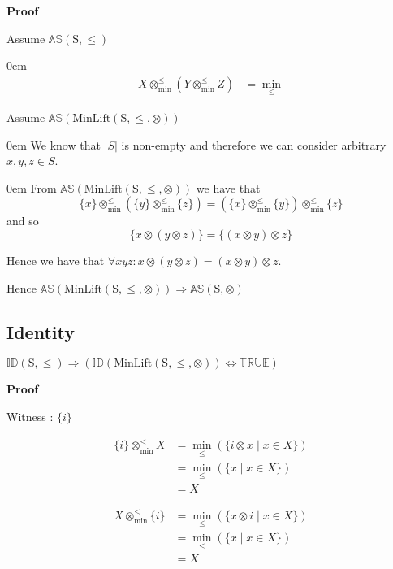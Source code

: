 \documentclass[10pt]{article}
\newcommand{\propname}[1]{{\mathbb{#1}}}
\newcommand{\minlift}{\otimes_{\min}^{\leq}}
\newcommand{\proof}{\vspace{1em} \textbf{Proof} \vspace{1em}}
\newenvironment{ind}[0]{\begin{addmargin}[1em]{0em}\vspace{0.5em}}{\end{addmargin}\vspace{0.5em}}
\begin{document}
\proof

Assume $\propname{AS}(\mathrm{S,\leq})$
\begin{ind}
\begin{align*}
X \minlift (Y \minlift Z) 	& = \min_\leq
\end{align*}
\end{ind}

\vspace{0.5em}


Assume $\propname{AS}(\mathrm{MinLift(S,\leq,\otimes)})$

\begin{ind}
We know that $|S|$ is non-empty and therefore we can consider arbitrary $x, y, z \in S$. 
\begin{ind}
From $\propname{AS}(\mathrm{MinLift(S,\leq,\otimes)})$ we have that
\begin{equation*}
\{ x \} \minlift (\{ y \} \minlift \{ z \}) = (\{ x \} \minlift \{ y \}) \minlift \{ z \}
\end{equation*}
and so
\begin{equation*}
\{x \otimes (y \otimes z) \} = \{ (x \otimes y) \otimes z \}
\end{equation*}
\end{ind}
Hence we have that $\forall x y z : x \otimes (y \otimes z) = (x \otimes y) \otimes z$.
\end{ind}
Hence $\propname{AS}(\mathrm{MinLift(S,\leq,\otimes)}) \Rightarrow \propname{AS}(\mathrm{S,\otimes})$


\subsection{Identity}

$\propname{ID}\mathrm{(S,\leq)} \Rightarrow (\propname{ID}(\mathrm{MinLift(S,\leq,\otimes)}) \Leftrightarrow \propname{TRUE})$

\proof

Witness : $\{ i \}$

\begin{align*}
\{ i \} \minlift X 	& = \min_\leq(\{i \otimes x \mid x \in X\}) \\
					& = \min_\leq(\{x \mid x \in X\}) \\
					& = X
\end{align*}

\begin{align*}
X \minlift \{ i \} 	& = \min_\leq(\{x \otimes i \mid x \in X\}) \\
					& = \min_\leq(\{x \mid x \in X\}) \\
					& = X
\end{align*}
\end{document}
